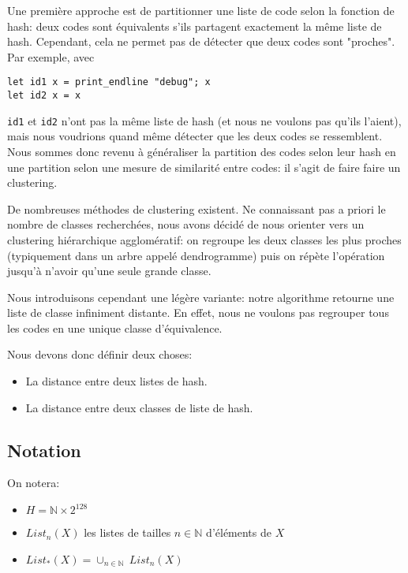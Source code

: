
Une première approche est de partitionner une liste de code selon la fonction de hash: deux codes sont équivalents s'ils partagent exactement la même liste de hash. Cependant, cela ne permet pas de détecter que deux codes sont "proches". Par exemple, avec

\begin{verbatim}
let id1 x = print_endline "debug"; x
let id2 x = x
\end{verbatim}

\verb|id1| et \verb|id2| n'ont pas la même liste de hash (et nous ne voulons pas qu'ils l'aient), mais nous voudrions quand même détecter que les deux codes se ressemblent. Nous sommes donc revenu à généraliser la partition des codes selon leur hash en une partition selon une mesure de similarité entre codes: il s'agit de faire faire un clustering.

De nombreuses méthodes de clustering existent. Ne connaissant pas a priori le nombre de classes recherchées, nous avons décidé de nous orienter vers un clustering hiérarchique agglomératif: on regroupe les deux classes les plus proches (typiquement dans un arbre appelé dendrogramme) puis on répète l'opération jusqu'à n'avoir qu'une seule grande classe.

Nous introduisons cependant une légère variante: notre algorithme retourne une liste de classe infiniment distante. En effet, nous ne voulons pas regrouper tous les codes en une unique classe d'équivalence.

Nous devons donc définir deux choses:
\begin{itemize}
\item La distance entre deux listes de hash.
\item La distance entre deux classes de liste de hash.
\end{itemize}

\subsection{Notation}
On notera:

\begin{itemize}
\item $H = \mathbb{N} \times 2^{128}$
\item $List_n(X)$ les listes de tailles $n \in \mathbb{N}$ d'éléments de $X$
\item $List_*(X) = \cup_{n\in\mathbb{N}}\ List_n(X)$
\end{itemize}


